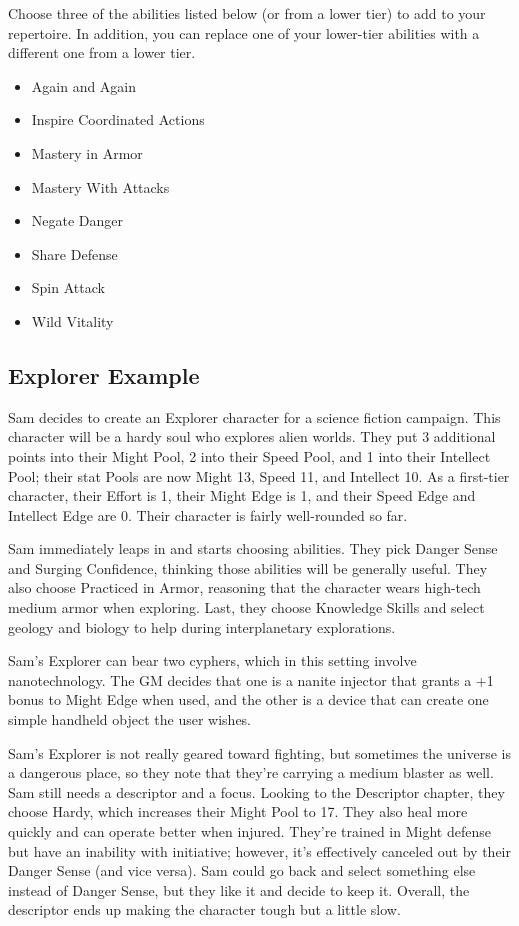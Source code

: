 Choose three of the abilities listed below (or from a lower tier) to add to your repertoire. In addition, you can replace one of your lower-tier abilities with a different one from a lower tier.

\begin{itemize}
\item Again and Again
\item Inspire Coordinated Actions
\item Mastery in Armor
\item Mastery With Attacks
\item Negate Danger
\item Share Defense
\item Spin Attack
\item Wild Vitality
\end{itemize}

\subsection{Explorer Example}

Sam decides to create an Explorer character for a science fiction campaign. This character will be a hardy soul who explores alien worlds. They put 3 additional points into their Might Pool, 2 into their Speed Pool, and 1 into their Intellect Pool; their stat Pools are now Might 13, Speed 11, and Intellect 10. As a first-tier character, their Effort is 1, their Might Edge is 1, and their Speed Edge and Intellect Edge are 0. Their character is fairly well-rounded so far.

Sam immediately leaps in and starts choosing abilities. They pick Danger Sense and Surging Confidence, thinking those abilities will be generally useful. They also choose Practiced in Armor, reasoning that the character wears high-tech medium armor when exploring. Last, they choose Knowledge Skills and select geology and biology to help during interplanetary explorations. 

Sam’s Explorer can bear two cyphers, which in this setting involve nanotechnology. The GM decides that one is a nanite injector that grants a +1 bonus to Might Edge when used, and the other is a device that can create one simple handheld object the user wishes. 

Sam’s Explorer is not really geared toward fighting, but sometimes the universe is a dangerous place, so they note that they’re carrying a medium blaster as well.
Sam still needs a descriptor and a focus. Looking to the Descriptor chapter, they choose Hardy, which increases their Might Pool to 17. They also heal more quickly and can operate better when injured. They’re trained in Might defense but have an inability with initiative; however, it’s effectively canceled out by their Danger Sense (and vice versa). Sam could go back and select something else instead of Danger Sense, but they like it and decide to keep it. Overall, the descriptor ends up making the character tough but a little slow.

